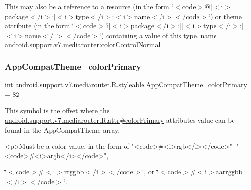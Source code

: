 This may also be a reference to a resource (in the form \char`\"{}$<$code$>$@\mbox{[}$<$i$>$package$<$/i$>$\+:\mbox{]}$<$i$>$type$<$/i$>$\+:$<$i$>$name$<$/i$>$$<$/code$>$\char`\"{}) or theme attribute (in the form \char`\"{}$<$code$>$?\mbox{[}$<$i$>$package$<$/i$>$\+:\mbox{]}\mbox{[}$<$i$>$type$<$/i$>$\+:\mbox{]}$<$i$>$name$<$/i$>$$<$/code$>$\char`\"{}) containing a value of this type.  name android.\+support.\+v7.\+mediarouter\+:color\+Control\+Normal \mbox{\label{classandroid_1_1support_1_1v7_1_1mediarouter_1_1R_1_1styleable_a0c6a69062686746906fdbde03f24524b}} 
\subsubsection{\texorpdfstring{App\+Compat\+Theme\+\_\+color\+Primary}{AppCompatTheme\_colorPrimary}}
{\footnotesize\ttfamily int android.\+support.\+v7.\+mediarouter.\+R.\+styleable.\+App\+Compat\+Theme\+\_\+color\+Primary = 82\hspace{0.3cm}{\ttfamily [static]}}

This symbol is the offset where the \hyperlink{classandroid_1_1support_1_1v7_1_1mediarouter_1_1R_1_1attr_a145bc9b53bbf312ff2935682368395ca}{android.\+support.\+v7.\+mediarouter.\+R.\+attr\#color\+Primary} attribute\textquotesingle{}s value can be found in the \hyperlink{classandroid_1_1support_1_1v7_1_1mediarouter_1_1R_1_1styleable_a4e3d3900c75d49aeb2f283cac00214d6}{App\+Compat\+Theme} array.

\begin{DoxyVerb}      <p>Must be a color value, in the form of "<code>#<i>rgb</i></code>", "<code>#<i>argb</i></code>",
\end{DoxyVerb}
 \char`\"{}$<$code$>$\#$<$i$>$rrggbb$<$/i$>$$<$/code$>$\char`\"{}, or \char`\"{}$<$code$>$\#$<$i$>$aarrggbb$<$/i$>$$<$/code$>$\char`\"{}. 

